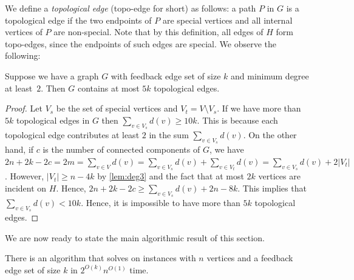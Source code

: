 We define a \emph{topological edge} (topo-edge for short) as follows: a path
$P$ in $G$ is a topological edge if the two endpoints of $P$ are special
vertices and all internal vertices of $P$ are non-special. Note that by this
definition, all edges of $H$ form topo-edges, since the endpoints of such edges
are special.  We observe the following:

\begin{lemma}\label{lem:topo} %
Suppose we have a graph $G$ with
feedback edge set of size $k$ and minimum degree at least~$2$. Then $G$
contains at most $5k$ topological edges.  
\end{lemma}

%

\begin{proof}%
Let $V_s$ be the set of special
vertices and $V_t=V\setminus V_s$. If we have more than $5k$ topological edges
in $G$ then $\sum_{v\in V_s}d(v)\ge 10k$. This is because each topological edge
contributes at least $2$ in the sum $\sum_{v\in V_s}d(v)$.  On the other hand,
if $c$ is the number of connected components of $G$, we have $2n+2k-2c = 2m =
\sum_{v\in V}d(v) = \sum_{v\in V_s}d(v) + \sum_{v\in V_t} d(v) = \sum_{v\in
V_s} d(v) +2|V_t|$.  However, $|V_t|\ge n-4k$ by \cref{lem:deg3} and the fact
that at most $2k$ vertices are incident on $H$.  Hence, $2n+2k-2c\ge \sum_{v\in
V_s}d(v) +2n-8k$.  This implies that $\sum_{v\in V_s}d(v)<10k$.  Hence, it is
impossible to have more than $5k$ topological edges. \end{proof}
%

We are now ready to state the main algorithmic result of this section.

\begin{theorem} 
There is an algorithm that solves \SF on instances with $n$
vertices and a feedback edge set of size $k$ in $2^{O(k)}n^{O(1)}$ time. 
\end{theorem}

